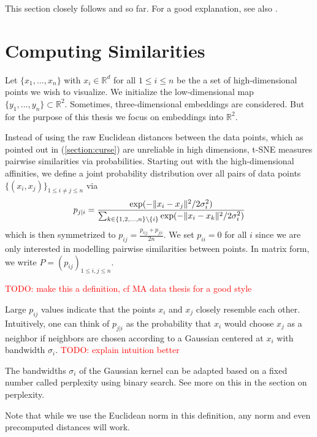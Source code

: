 This section closely follows \cite{Cai22} and \cite{vdMaa08} so far. For a good explanation, see also \cite{vdMaa14}. 


\section{Computing Similarities}
Let $\{x_1, \dots , x_n \}$ with $x_i \in \mathbb{R}^d$ for all $1 \leq i \leq n$ be the a set of high-dimensional points we wish to visualize.
We initialize the low-dimensional map $\{y_1, \dots , y_n\} \subset \mathbb{R}^2$. Sometimes, three-dimensional embeddings are considered. But for the purpose of this thesis we focus on embeddings into $\mathbb{R}^2$. 

Instead of using the raw Euclidean distances between the data points, which as pointed out in (\ref{section:curse}) are unreliable in high dimensions, t-SNE measures pairwise similarities via probabilities.
Starting out with the high-dimensional affinities, we define a joint probability distribution over all pairs of data points $\{(x_i, x_j)\}_{1 \leq i \neq j \leq n}$ via  
\begin{equation}
    p_{j|i} =  \frac{\exp(-\lVert x_i - x_j\rVert^2 / 2\sigma_i^2)}{\sum_{k \in \{1,2, \dots, n\} \backslash \{i\}} \exp({-\lVert x_i - x_k\rVert^2 / 2 \sigma_i^2})}
\end{equation}
which is then symmetrized to $p_{ij} = \frac{p_{i|j} + p_{j|i}}{2n}$. We set $p_{ii}=0$ for all $i$ since we are only interested in modelling pairwise similarities between points. In matrix form, we write $P = (p_{ij})_{1 \leq i, j \leq n}$. 

\textcolor{red}{TODO: make this a definition, cf MA data thesis for a good style}

Large $p_{ij}$ values indicate that the points $x_i$ and $x_j$ closely resemble each other. 
Intuitively, one can think of $p_{j|i}$ as the probability that $x_i$ would choose $x_j$ as a neighbor if neighbors are chosen according to a Gaussian centered at $x_i$ with bandwidth $\sigma_i$. 
\textcolor{red}{TODO: explain intuition better}

The bandwidths $\sigma_i$ of the Gaussian kernel can be adapted based on a fixed number called perplexity using binary search. See more on this in the section on perplexity. 

Note that while we use the Euclidean norm in this definition, any norm and even precomputed distances will work. 

